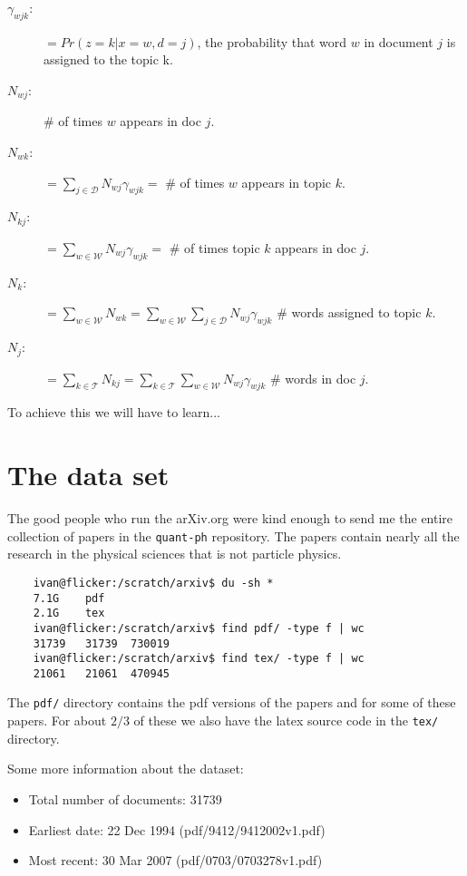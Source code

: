 \documentclass[11pt]{article}
\newcommand{\DD}{\mathcal{D}}
\newcommand{\WW}{\mathcal{W}}
\newcommand{\TT}{\mathcal{T}}
\begin{document}
    
    \begin{description}
	\item[$\gamma_{wjk}$:]	$=Pr( z=k | x=w,d=j)$, the probability that word $w$ in document $j$ 
						is assigned to the topic k.
	\item[$N_{wj}$:]	\# of times $w$ appears in doc $j$. 
	\item[$N_{wk}$:]  $=\displaystyle\sum_{j\in \DD} N_{wj}\gamma_{wjk} = $ \# of times $w$ appears in topic $k$.
	\item[$N_{kj}$:]  $=\displaystyle\sum_{w\in \WW} N_{wj}\gamma_{wjk} = $ \# of times topic $k$ appears in doc $j$.
	\item[$N_{k}$:]  $=\displaystyle\sum_{w\in \WW} N_{wk}=  \displaystyle\sum_{w\in \WW}\sum_{j\in \DD} N_{wj}\gamma_{wjk} $ \# words assigned to  topic $k$.
	\item[$N_{j}$: ]  $=\displaystyle\sum_{k \in \TT} N_{kj} =  \displaystyle\sum_{k \in \TT}\sum_{w\in \WW}N_{wj}\gamma_{wjk} $ \# words in doc $j$.
    \end{description}


    To achieve this we will have to learn...


\section{The data set}

	The good people who run the arXiv.org were kind enough to send me the entire collection of papers
	in the \texttt{quant-ph} repository. The papers contain nearly all the research in the physical sciences
	that is not particle physics.
	 
	\begin{verbatim}
	ivan@flicker:/scratch/arxiv$ du -sh *
	7.1G    pdf
	2.1G    tex
	ivan@flicker:/scratch/arxiv$ find pdf/ -type f | wc
	31739   31739  730019
	ivan@flicker:/scratch/arxiv$ find tex/ -type f | wc
	21061   21061  470945
	\end{verbatim}
	
	The \texttt{pdf/} directory contains the pdf versions of the papers and for some of these papers.
	For about $2/3$ of these we also have the latex source code in the \texttt{tex/} directory.
	
	Some more information about the dataset:
	\begin{itemize}
		\item Total number of documents: 31739
		\item Earliest date: 22 Dec 1994  (pdf/9412/9412002v1.pdf)
		\item Most recent:  30 Mar 2007 (pdf/0703/0703278v1.pdf)
	\end{itemize}
	
\end{document}
